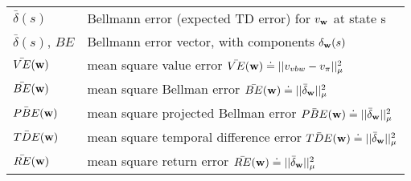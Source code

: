 \documentclass[10pt, landscape, a4paper]{article}
\begin{document}
\begin{multicols}{3}
        \begin{tabular}{ p{} p{} }
            $\bar{\delta}(s)$       & Bellmann error (expected TD error) for $v_{\vb{w}}$ at state s                                 \\
            $\bar{\delta}(s)$, $BE$ & Bellmann error vector, with components $\delta_{\vb{w}}(s)$                                    \\
            $\bar{VE}(\vb{w})$      & mean square value error $\bar{VE}(\vb{w})\doteq||v_{vb{w}} - v_\pi||_\mu^2$                    \\
            $\bar{BE}(\vb{w})$      & mean square Bellman error $\bar{BE}(\vb{w})\doteq||\bar{\delta}_{\vb{w}}||_\mu^2$              \\
            $\bar{PBE}(\vb{w})$     & mean square projected Bellman error $\bar{PBE}(\vb{w})\doteq||\bar{\delta}_{\vb{w}}||_\mu^2$   \\
            $\bar{TDE}(\vb{w})$     & mean square temporal difference error $\bar{TDE}(\vb{w})\doteq||\bar{\delta}_{\vb{w}}||_\mu^2$ \\
            $\bar{RE}(\vb{w})$      & mean square return error $\bar{RE}(\vb{w})\doteq||\bar{\delta}_{\vb{w}}||_\mu^2$               \\
        \end{tabular}
    \end{multicols}

    \newpage
\end{document}
